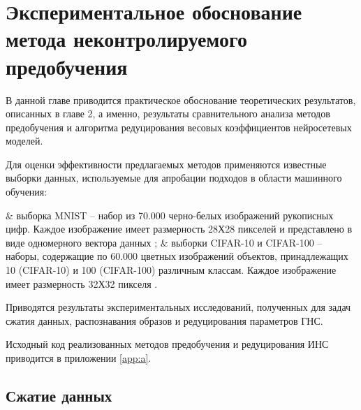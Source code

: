 \chapter{Экспериментальное обоснование метода неконтролируемого предобучения}

В данной главе приводится практическое обоснование теоретических результатов, описанных в главе 2, а именно, результаты сравнительного анализа методов предобучения и алгоритма редуцирования весовых коэффициентов нейросетевых моделей.

Для оценки эффективности предлагаемых методов применяются известные выборки данных, используемые для апробации подходов в области машинного обучения:
\begin{easylistNum}
    & выборка MNIST -- набор из 70.000 черно-белых изображений рукописных цифр. Каждое изображение имеет размерность 28Х28 пикселей и представлено в виде одномерного вектора данных \cite{mnist};
    & выборки CIFAR-10 и CIFAR-100 -- наборы, содержащие по 60.000 цветных изображений объектов, принадлежащих 10 (CIFAR-10) и 100 (CIFAR-100) различным классам. Каждое изображение имеет размерность 32Х32 пикселя \cite{krizhevsky2009learning}.
\end{easylistNum}

Приводятся результаты экспериментальных исследований, полученных для задач сжатия данных, распознавания образов и редуцирования параметров ГНС.

Исходный код реализованных методов предобучения и редуцирования ИНС приводится в приложении \ref{app:a}.



\section{Сжатие данных}


